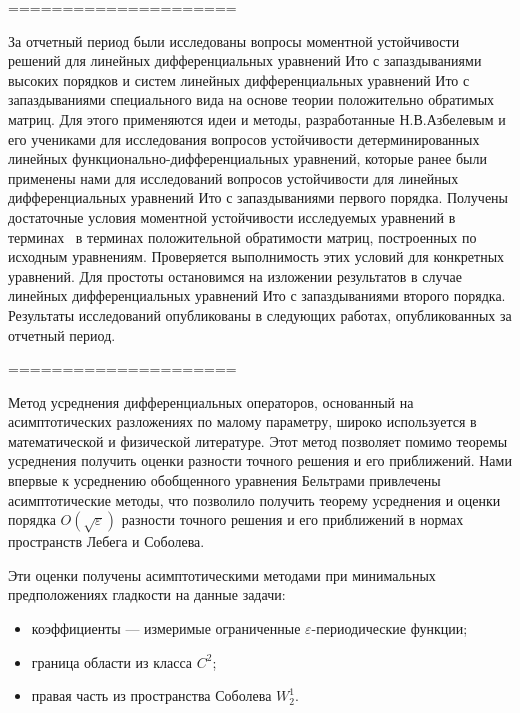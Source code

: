 =====================




За отчетный период были исследованы вопросы моментной устойчивости решений для линейных дифференциальных уравнений Ито с
запаздываниями высоких порядков и систем линейных дифференциальных уравнений Ито с запаздываниями специального вида на
основе теории положительно обратимых матриц. Для этого применяются идеи и методы, разработанные Н.В.Азбелевым и его
учениками для исследования вопросов устойчивости детерминированных линейных функционально-дифференциальных уравнений,
которые ранее были применены нами для исследований вопросов устойчивости для линейных дифференциальных уравнений Ито с
запаздываниями первого порядка. Получены достаточные условия моментной устойчивости исследуемых уравнений в терминах
\ в терминах положительной обратимости матриц, построенных по исходным уравнениям. Проверяется выполнимость этих
условий для конкретных уравнений. Для простоты остановимся на изложении результатов в случае линейных дифференциальных
уравнений Ито с запаздываниями второго порядка. Результаты исследований опубликованы в следующих работах,
опубликованных за отчетный период.




=====================




Метод усреднения дифференциальных операторов, основанный на асимптотических разложениях по малому параметру, широко используется  в математической и физической литературе. Этот метод позволяет помимо теоремы усреднения получить оценки разности точного решения и его приближений. Нами впервые к усреднению обобщенного уравнения Бельтрами привлечены асимптотические методы, что позволило получить теорему усреднения и оценки порядка $O(\sqrt{\varepsilon})$ разности точного решения и его приближений в нормах пространств Лебега и Соболева.


Эти оценки получены асимптотическими методами при минимальных предположениях гладкости на данные задачи:

\begin{itemize}
	\item
	коэффициенты --- измеримые ограниченные $\varepsilon$-периодические функции;
	\item
	граница области из класса $C^2$;
	\item
	правая часть из пространства Соболева $W_2^1$.
\end{itemize}

